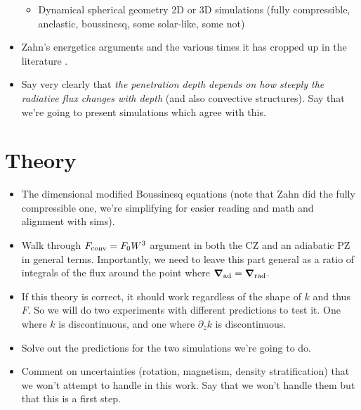 \documentclass[12pt]{article}
\renewcommand{\vec}[1]{\boldsymbol{#1}}
\newcommand{\grad}{\vec{\nabla}}
\begin{document}
\begin{itemize}
\begin{itemize}
\item Dynamical spherical geometry 2D or 3D simulations (fully compressible, anelastic, boussinesq, some solar-like, some not) \citep{browning_etal_2004, rogers_etal_2006, brun_etal_2017, pratt_etal_2017, dietrich_wicht_2018}
\end{itemize}
\item Zahn's energetics arguments and the various times it has cropped up in the literature \citep{zahn1991, hurlburt_etal_1994, rempel2004, rogers_etal_2006}.
\item Say very clearly that \emph{the penetration depth depends on how steeply the radiative flux changes with depth} (and also convective structures).
Say that we're going to present simulations which agree with this.
\end{itemize}

\section{Theory}
\begin{itemize}
\item The dimensional modified Boussinesq equations (note that Zahn did the fully compressible one, we're simplifying for easier reading and math and alignment with sims).
\item Walk through $F_{\rm{conv}} = F_0 W^3$ argument in both the CZ and an adiabatic PZ in general terms.
Importantly, we need to leave this part general as a ratio of integrals of the flux around the point where $\grad_{\rm{ad}} = \grad_{\rm{rad}}$.
\item If this theory is correct, it should work regardless of the shape of $k$ and thus $F$. So we will do two experiments with different predictions to test it.
One where $k$ is discontinuous, and one where $\partial_z k$ is discontinuous.
\item Solve out the predictions for the two simulations we're going to do.
\item Comment on uncertainties (rotation, magnetism, density stratification) that we won't attempt to handle in this work.
Say that we won't handle them but that this is a first step.
\end{itemize}
\end{document}
